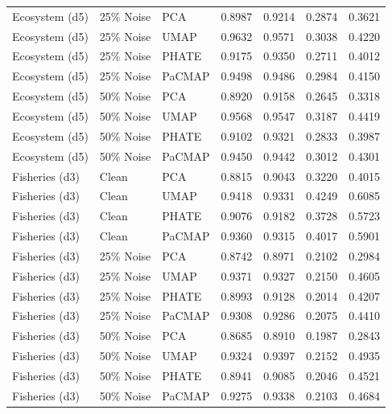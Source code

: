 \begin{table}[t]
\begin{tabular}{lllcccc}
    Ecosystem (d5) & 25\% Noise & PCA & 0.8987 & 0.9214 & 0.2874 & 0.3621 \\
    Ecosystem (d5) & 25\% Noise & UMAP & 0.9632 & 0.9571 & 0.3038 & 0.4220 \\
    Ecosystem (d5) & 25\% Noise & PHATE & 0.9175 & 0.9350 & 0.2711 & 0.4012 \\
    Ecosystem (d5) & 25\% Noise & PaCMAP & 0.9498 & 0.9486 & 0.2984 & 0.4150 \\
    
    Ecosystem (d5) & 50\% Noise & PCA & 0.8920 & 0.9158 & 0.2645 & 0.3318 \\
    Ecosystem (d5) & 50\% Noise & UMAP & 0.9568 & 0.9547 & 0.3187 & 0.4419 \\
    Ecosystem (d5) & 50\% Noise & PHATE & 0.9102 & 0.9321 & 0.2833 & 0.3987 \\
    Ecosystem (d5) & 50\% Noise & PaCMAP & 0.9450 & 0.9442 & 0.3012 & 0.4301 \\
    
    Fisheries (d3) & Clean & PCA & 0.8815 & 0.9043 & 0.3220 & 0.4015 \\
    Fisheries (d3) & Clean & UMAP & 0.9418 & 0.9331 & 0.4249 & 0.6085 \\
    Fisheries (d3) & Clean & PHATE & 0.9076 & 0.9182 & 0.3728 & 0.5723 \\
    Fisheries (d3) & Clean & PaCMAP & 0.9360 & 0.9315 & 0.4017 & 0.5901 \\
    
    Fisheries (d3) & 25\% Noise & PCA & 0.8742 & 0.8971 & 0.2102 & 0.2984 \\
    Fisheries (d3) & 25\% Noise & UMAP & 0.9371 & 0.9327 & 0.2150 & 0.4605 \\
    Fisheries (d3) & 25\% Noise & PHATE & 0.8993 & 0.9128 & 0.2014 & 0.4207 \\
    Fisheries (d3) & 25\% Noise & PaCMAP & 0.9308 & 0.9286 & 0.2075 & 0.4410 \\
    
    Fisheries (d3) & 50\% Noise & PCA & 0.8685 & 0.8910 & 0.1987 & 0.2843 \\
    Fisheries (d3) & 50\% Noise & UMAP & 0.9324 & 0.9397 & 0.2152 & 0.4935 \\
    Fisheries (d3) & 50\% Noise & PHATE & 0.8941 & 0.9085 & 0.2046 & 0.4521 \\
    Fisheries (d3) & 50\% Noise & PaCMAP & 0.9275 & 0.9338 & 0.2103 & 0.4684 \\
    

\end{tabular}
\end{table}
